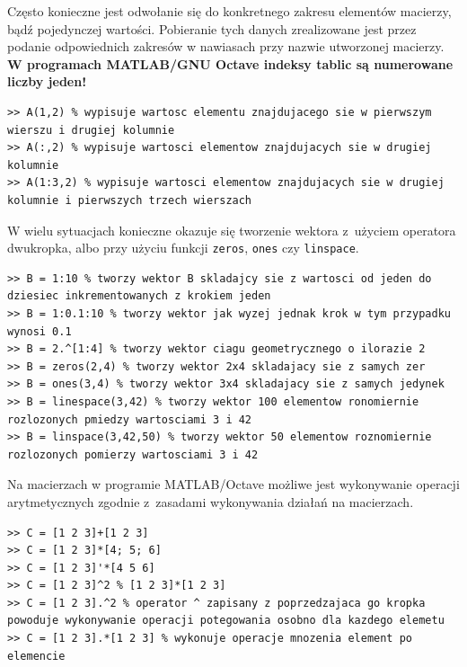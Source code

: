 Często konieczne jest odwołanie się do konkretnego zakresu elementów macierzy, bądź pojedynczej wartości. Pobieranie tych danych zrealizowane jest przez podanie odpowiednich zakresów w nawiasach przy nazwie utworzonej macierzy. \textbf{W programach MATLAB/GNU Octave indeksy tablic są numerowane liczby jeden!}
\begin{lstlisting}[caption=Odwoływanie się do elementów macierzy , label=lab1/lst/matrixElements]
>> A(1,2) % wypisuje wartosc elementu znajdujacego sie w pierwszym wierszu i drugiej kolumnie
>> A(:,2) % wypisuje wartosci elementow znajdujacych sie w drugiej kolumnie
>> A(1:3,2) % wypisuje wartosci elementow znajdujacych sie w drugiej kolumnie i pierwszych trzech wierszach
\end{lstlisting}

W wielu sytuacjach konieczne okazuje się tworzenie wektora z~użyciem operatora dwukropka, albo przy użyciu funkcji \texttt{zeros}, \texttt{ones} czy \texttt{linspace}. 
\begin{lstlisting}[caption=Tworzenie macierzy z wykorzystaniem funkcji oraz operatora \texttt{:} , label=lab1/lst/matrixZerosOnesLinespace]
>> B = 1:10 % tworzy wektor B skladajcy sie z wartosci od jeden do dziesiec inkrementowanych z krokiem jeden
>> B = 1:0.1:10 % tworzy wektor jak wyzej jednak krok w tym przypadku wynosi 0.1
>> B = 2.^[1:4] % tworzy wektor ciagu geometrycznego o ilorazie 2
>> B = zeros(2,4) % tworzy wektor 2x4 skladajacy sie z samych zer
>> B = ones(3,4) % tworzy wektor 3x4 skladajacy sie z samych jedynek
>> B = linespace(3,42) % tworzy wektor 100 elementow ronomiernie rozlozonych pmiedzy wartosciami 3 i 42
>> B = linspace(3,42,50) % tworzy wektor 50 elementow roznomiernie rozlozonych pomierzy wartosciami 3 i 42
\end{lstlisting}

Na macierzach w programie MATLAB/Octave możliwe jest wykonywanie operacji arytmetycznych zgodnie z~zasadami wykonywania działań na macierzach.
\begin{lstlisting}[caption=Operacje arytmetyczne na macierzach , label=lab1/lst/matrixOperations]
>> C = [1 2 3]+[1 2 3]
>> C = [1 2 3]*[4; 5; 6]
>> C = [1 2 3]'*[4 5 6]
>> C = [1 2 3]^2 % [1 2 3]*[1 2 3]
>> C = [1 2 3].^2 % operator ^ zapisany z poprzedzajaca go kropka powoduje wykonywanie operacji potegowania osobno dla kazdego elemetu
>> C = [1 2 3].*[1 2 3] % wykonuje operacje mnozenia element po elemencie
\end{lstlisting}

